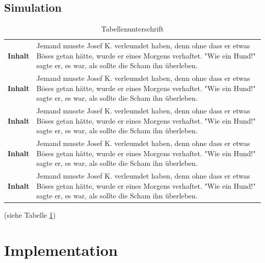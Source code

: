     \section{Simulation}
    \begin{table}[H]
        \begin{tabular}{p{}p{}}
            \textbf{Inhalt} & Jemand musste Josef K. verleumdet haben, denn ohne dass er etwas Böses getan hätte, wurde er eines Morgens verhaftet. "Wie ein Hund!" sagte er, es war, als sollte die Scham ihn überleben.\\
            \textbf{Inhalt} & Jemand musste Josef K. verleumdet haben, denn ohne dass er etwas Böses getan hätte, wurde er eines Morgens verhaftet. "Wie ein Hund!" sagte er, es war, als sollte die Scham ihn überleben.\\
            \textbf{Inhalt} & Jemand musste Josef K. verleumdet haben, denn ohne dass er etwas Böses getan hätte, wurde er eines Morgens verhaftet. "Wie ein Hund!" sagte er, es war, als sollte die Scham ihn überleben.\\
            \textbf{Inhalt} & Jemand musste Josef K. verleumdet haben, denn ohne dass er etwas Böses getan hätte, wurde er eines Morgens verhaftet. "Wie ein Hund!" sagte er, es war, als sollte die Scham ihn überleben.\\
            \textbf{Inhalt} & Jemand musste Josef K. verleumdet haben, denn ohne dass er etwas Böses getan hätte, wurde er eines Morgens verhaftet. "Wie ein Hund!" sagte er, es war, als sollte die Scham ihn überleben.\\
        \end{tabular}
        \caption{Tabellenunterschrift}
        \label{tabe2}
    \end{table}
    \blindtext (siehe Tabelle \ref{tabe2})
\clearpage
\chapter{Implementation}

